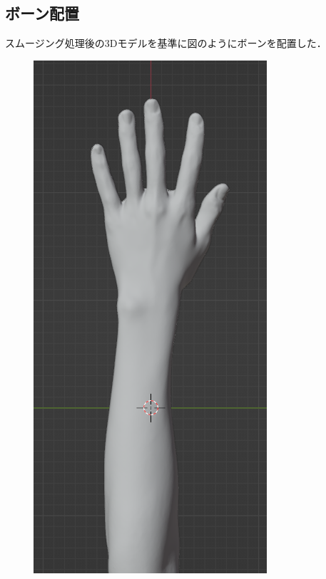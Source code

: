 \documentclass{ltjsreport}
\begin{document}
		\subsection{ボーン配置}
			スムージング処理後の3Dモデルを基準に図のようにボーンを配置した．
			\begin{figure}[H]
			\centering
			\begin{minipage}{0.2\columnwidth}
			\centering
			\includegraphics[width = \columnwidth]{../figs/handmeshLat.png}

\end{minipage}
\end{figure}
\end{document}
